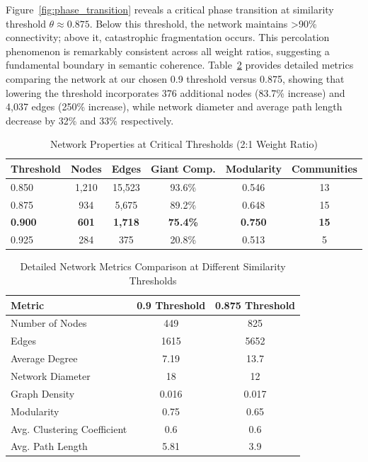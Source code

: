 Figure~\ref{fig:phase_transition} reveals a critical phase transition at similarity threshold $\theta \approx 0.875$. Below this threshold, the network maintains >90\% connectivity; above it, catastrophic fragmentation occurs. This percolation phenomenon is remarkably consistent across all weight ratios, suggesting a fundamental boundary in semantic coherence. Table~\ref{tab:threshold_comparison} provides detailed metrics comparing the network at our chosen 0.9 threshold versus 0.875, showing that lowering the threshold incorporates 376 additional nodes (83.7\% increase) and 4,037 edges (250\% increase), while network diameter and average path length decrease by 32\% and 33\% respectively.

\begin{table}[h]
\centering
\caption{Network Properties at Critical Thresholds (2:1 Weight Ratio)}
\label{tab:threshold_critical}
\begin{tabular}{lccccc}
\toprule
\textbf{Threshold} & \textbf{Nodes} & \textbf{Edges} & \textbf{Giant Comp.} & \textbf{Modularity} & \textbf{Communities} \\
\midrule
0.850 & 1,210 & 15,523 & 93.6\% & 0.546 & 13 \\
0.875 & 934 & 5,675 & 89.2\% & 0.648 & 15 \\
\textbf{0.900} & \textbf{601} & \textbf{1,718} & \textbf{75.4\%} & \textbf{0.750} & \textbf{15} \\
0.925 & 284 & 375 & 20.8\% & 0.513 & 5 \\
\bottomrule
\end{tabular}
\end{table}

\begin{table}[h]
\centering
\caption{Detailed Network Metrics Comparison at Different Similarity Thresholds}
\label{tab:threshold_comparison}
\begin{tabular}{l@{\hspace{1cm}}c@{\hspace{1cm}}c}
\toprule
\textbf{Metric} & \textbf{0.9 Threshold} & \textbf{0.875 Threshold} \\
\midrule
Number of Nodes & 449 & 825 \\
Edges & 1615 & 5652 \\
Average Degree & 7.19 & 13.7 \\
Network Diameter & 18 & 12 \\
Graph Density & 0.016 & 0.017 \\
Modularity & 0.75 & 0.65 \\
Avg. Clustering Coefficient & 0.6 & 0.6 \\
Avg. Path Length & 5.81 & 3.9 \\
\bottomrule
\end{tabular}
\end{table}

